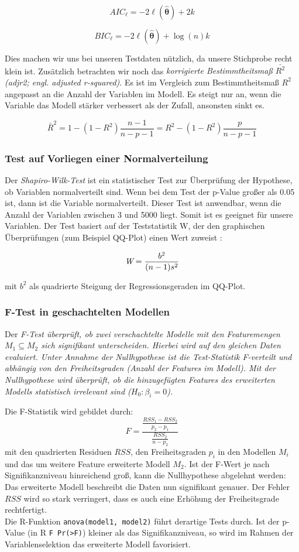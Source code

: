 $$\displaystyle AIC_{\ell }=-2\ell (\mathbf {\hat {\theta }} )+2k$$

$$\displaystyle BIC_{\ell }=-2\ell (\mathbf {\hat {\theta }} )+\log(n)k$$

Dies machen wir uns bei unseren Testdaten nützlich, da unsere Stichprobe recht klein ist. Zusätzlich betrachten wir noch das \emph{korrigierte Bestimmtheitsmaß  $\bar{R^2}$ (adjr2; engl. \it{adjusted r-squared})}. Es ist im Vergleich zum Bestimmtheitsmaß $R^2$ angepasst an die Anzahl der Variablen im Modell. Es steigt nur an, wenn die Variable das Modell stärker verbessert als der Zufall, ansonsten sinkt es.

$$\bar R^2 = 1- (1-R^2) \frac{n-1}{n-p-1} = R^2 - (1-R^2) \frac{p}{n-p-1}$$

\subsubsection{Test auf Vorliegen einer Normalverteilung}

Der \emph{Shapiro-Wilk-Test} ist ein statistischer Test zur Überprüfung der Hypothese, ob Variablen normalverteilt sind. Wenn bei dem Test der p-Value großer als 0.05 ist, dann ist die Variable normalverteilt.
Dieser Test ist anwendbar, wenn die Anzahl der Variablen zwischen 3 und 5000 liegt.
Somit ist es geeignet für unsere Variablen. Der Test basiert auf der Teststatistik W, der den graphischen Überprüfungen (zum Beispiel QQ-Plot) einen Wert zuweist \cite{2012shapiro}:

$$\textit{W} = {{b^2}\over {(n-1)s^2}}$$


\noindent mit $b^2$ als quadrierte Steigung der Regressionsgeraden im QQ-Plot.


\subsubsection{F-Test in geschachtelten Modellen}
Der \it{F-Test} überprüft, ob zwei verschachtelte Modelle mit den Featuremengen $M_1 \subseteq M_2$ sich signifikant unterscheiden.
Hierbei wird auf den gleichen Daten evaluiert.
Unter Annahme der Nullhypothese ist die Test-Statistik F-verteilt und abhängig von den Freiheitsgraden (Anzahl der Features im Modell).
Mit der Nullhypothese wird überprüft, ob die hinzugefügten Features des erweiterten Modells statistisch irrelevant sind ($H_0: \beta_i = 0$).

Die F-Statistik wird gebildet durch:
\begin{equation}
	F=\frac{\frac{RSS_1-RSS_2}{p_2-p_1}}{\frac{RSS_2}{n-p_2}}
\end{equation}
mit den quadrierten Residuen $RSS$, den Freiheitsgraden $p_i$ in den Modellen $M_i$ und das um weitere Feature erweiterte Modell $M_2$.
Ist der F-Wert je nach Signifikanzniveau hinreichend groß, kann die Nullhypothese abgelehnt werden:
Das erweiterte Modell beschreibt die Daten nun signifikant genauer.
Der Fehler $RSS$ wird so stark verringert, dass es auch eine Erhöhung der Freiheitsgrade rechtfertigt. 
\\
Die R-Funktion \lstinline|anova(model1, model2)| führt derartige Tests durch.
Ist der p-Value (in R \lstinline|F Pr(>F)|) kleiner als das Signifikanzniveau, so wird im Rahmen der Variablenselektion das erweiterte Modell favorisiert.
